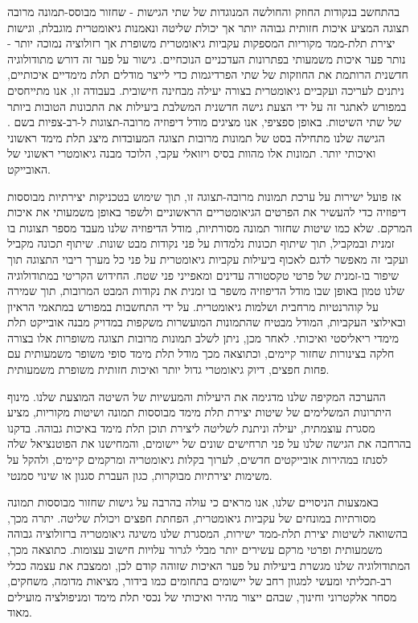 {בהתחשב בנקודות החוזק והחולשה המנוגדות של שתי הגישות - שחזור מבוסס-תמונה מרובה תצוגה המציע איכות חזותית גבוהה יותר אך יכולת שליטה ונאמנות גיאומטרית מוגבלת, וגישות יצירת תלת-ממד מקוריות המספקות עקביות גיאומטרית משופרת אך רזולוציה נמוכה יותר - נותר פער איכות משמעותי בפתרונות העדכניים הנוכחיים. גישור על פער זה דורש מתודולוגיה חדשנית הרותמת את החוזקות של שתי הפרדיגמות כדי לייצר מודלים תלת מימדיים איכותיים, ניתנים לעריכה ועקביים גיאומטרית בצורה יעילה מבחינה חישובית.
בעבודה זו, אנו מתייחסים במפורש לאתגר זה על ידי הצעת גישה חדשנית המשלבת ביעילות את התכונות הטובות ביותר של שתי השיטות. באופן ספציפי, אנו מציגים מודל דיפוזיה מרובה-תצוגות ל-רב-צפיות בשם \ourname{}. הגישה שלנו מתחילה בסט של תמונות מרובות תצוגה המעובדות מיצג תלת מימד ראשוני ואיכותי יותר. תמונות אלו מהוות בסיס ויזואלי עקבי, הלוכד מבנה גיאומטרי ראשוני של האובייקט.

\ourname{} אז פועל ישירות על ערכת תמונות מרובה-תצוגה זו, תוך שימוש בטכניקות יצירתיות מבוססות דיפוזיה כדי להעשיר את הפרטים הגיאומטריים הראשוניים ולשפר באופן משמעותי את איכות המרקם. שלא כמו שיטות שחזור תמונה מסורתיות, מודל הדיפוזיה שלנו מעבד מספר תצוגות בו זמנית ובמקביל, תוך שיתוף תכונות נלמדות על פני נקודות מבט שונות. שיתוף תכונה מקביל ועקבי זה מאפשר לדגם לאכוף ביעילות עקביות גיאומטרית על פני כל מערך ריבוי התצוגה תוך שיפור בו-זמנית של פרטי טקסטורה עדינים ומאפייני פני שטח.
החידוש הקריטי במתודולוגיה שלנו טמון באופן שבו מודל הדיפוזיה משפר בו זמנית את נקודות המבט המרובות, תוך שמירה על קוהרנטיות מרחבית ושלמות גיאומטרית. על ידי התחשבות במפורש במתאמי הראיון ובאילוצי העקביות, המודל מבטיח שהתמונות המועשרות משקפות במדויק מבנה אובייקט תלת מימדי ריאליסטי ואיכותי. לאחר מכן, ניתן לשלב תמונות מרובות תצוגה משופרות אלו בצורה חלקה בצינורות שחזור קיימים, וכתוצאה מכך מודל תלת מימד סופי משופר משמעותית עם פחות חפצים, דיוק גיאומטרי גדול יותר ואיכות חזותית משופרת משמעותית.

ההערכה המקיפה שלנו מדגימה את היעילות והמעשיות של השיטה המוצעת שלנו. מינוף היתרונות המשלימים של שיטות יצירת תלת מימד מבוססות תמונה ושיטות מקוריות, \ourname{} מציע מסגרת עוצמתית, יעילה וניתנת לשליטה ליצירת תוכן תלת מימד באיכות גבוהה. בדקנו בהרחבה את הגישה שלנו על פני תרחישים שונים של יישומים, והמחישנו את הפוטנציאל שלה לסנתז במהירות אובייקטים חדשים, לערוך בקלות גיאומטריה ומרקמים קיימים, ולהקל על משימות יצירתיות מבוקרות, כגון העברת סגנון או שינוי סמנטי.

באמצעות הניסויים שלנו, אנו מראים כי \ourname{} עולה בהרבה על גישות שחזור מבוססות תמונה מסורתיות במונחים של עקביות גיאומטרית, הפחתת חפצים ויכולת שליטה. יתרה מכך, בהשוואה לשיטות יצירת תלת-ממד ישירות, המסגרת שלנו משיגה גיאומטריה ברזולוציה גבוהה משמעותית ופרטי מרקם עשירים יותר מבלי לגרור עלויות חישוב עצומות. כתוצאה מכך, המתודולוגיה שלנו מגשרת ביעילות על פער האיכות שזוהה קודם לכן, וממצבת את עצמה ככלי רב-תכליתי ומעשי למגוון רחב של יישומים בתחומים כמו בידור, מציאות מדומה, משחקים, מסחר אלקטרוני וחינוך, שבהם ייצור מהיר ואיכותי של נכסי תלת מימד ומניפולציה מועילים מאוד.

}
